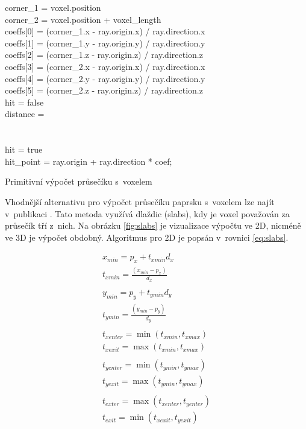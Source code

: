 \begin{center}
	\begin{czechalgorithm}[H] \label{alg:ray_box_primitive}
		corner_1 = voxel.position\\
		corner_2 = voxel.position + voxel\_length\\
		coeffs[0] = (corner_1.x - ray.origin.x) / ray.direction.x\\
		coeffs[1] = (corner_1.y - ray.origin.y) / ray.direction.y\\
		coeffs[2] = (corner_1.z - ray.origin.z) / ray.direction.z\\
		coeffs[3] = (corner_2.x - ray.origin.x) / ray.direction.x\\
		coeffs[4] = (corner_2.y - ray.origin.y) / ray.direction.y\\
		coeffs[5] = (corner_2.z - ray.origin.z) / ray.direction.z\\
		hit = false\\
		distance = \inf\\
		 {\\
			 {\\
				hit = true\\
				hit\_point = ray.origin + ray.direction * coef;\\
			}
		}
		\caption{Primitivní výpočet průsečíku s~voxelem}
	\end{czechalgorithm}
\end{center}

Vhodnější alternativu pro výpočet průsečíku paprsku s~voxelem lze najít v~publikaci \cite{efficient_box_intersect}. Tato metoda využívá dlaždic (slabs), kdy je voxel považován za průsečík tří z~nich. Na obrázku \ref{fig:slabs} je vizualizace výpočtu ve 2D, nicméně ve 3D je výpočet obdobný. Algoritmus pro 2D je popsán v~rovnici \ref{eq:slabs}.


\begin{equation} \label{eq:slabs}
	\begin{gathered}
		x_{min} = p_x + t_{xmin} d_x\\
		t_{xmin} = \frac{(x_{min} - p_x)}{d_x}\\
		\\
		y_{min} = p_y + t_{ymin} d_y\\
		t_{ymin} = \frac{(y_{min} - p_y)}{d_y}\\
		\\
		t_{xenter} = \min(t_{xmin}, t_{xmax})\\
		t_{xexit} = \max(t_{xmin}, t_{xmax})\\
		\\
		t_{yenter} = \min(t_{ymin}, t_{ymax})\\
		t_{yexit} = \max(t_{ymin}, t_{ymax})\\
		\\
		t_{exter} = \max(t_{xenter}, t_{yenter})\\
		t_{exit} = \min(t_{xexit}, t_{yexit})\\
	\end{gathered}
\end{equation}

